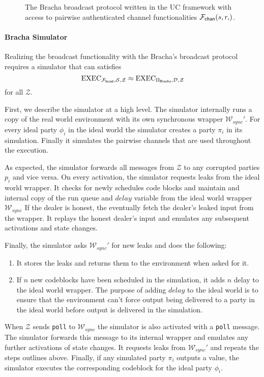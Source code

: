 \begin{figure}[!htb]
	
	\caption{The Bracha broadcast protocol written in the UC framework with access to pairwise authenticated channel functionalities $\Fchan{s,r}$.}
	\label{fig:prot:bracha_ours}
\end{figure}

\paragraph{Bracha Simulator}
Realizing the broadcast functionality with the Bracha's broadcast protocol requires a simulator that can satisfies
\[ \text{EXEC}_{\mathcal{F_{{\mathsf {bcast}}}},\mathcal{S},\mathcal{Z}} \approx \text{EXEC}_{\Pi_{{\mathsf {Bracha}}},\mathcal{D},\mathcal{Z}} \]
for all $\mathcal{Z}$.

First, we describe the simulator at a high level.
The simulator internally runs a copy of the real world environment with its own synchronous wrapper $\mathcal{W}_{sync}'$.
For every ideal party $\phi_i$ in the ideal world the simulator creates a party $\pi_i$ in its simulation.
Finally it simulates the pairwise channels that are used throughout the execution.

As expected, the simulator forwards all messages from $\mathcal{Z}$ to any corrupted parties $p_i$ and vice versa.
On every activation, the simulator requests leaks from the ideal world wrapper.
It checks for newly schedules code blocks and maintain and internal copy of the run queue and $delay$ variable from the ideal world wrapper $\mathcal{W}_{sync}$
If the dealer is honest, the eventually fetch the dealer's leaked input from the wrapper. 
It replays the honest dealer's input and emulates any subsequent activations and state changes.

Finally, the simulator asks $\mathcal{W}_{sync}'$ for new leaks and does the following:
\begin{enumerate}
	\item It stores the leaks and returns them to the environment when asked for it.
	\item If $n$ new codeblocks have been scheduled in the simulation, it adds $n$ delay to the ideal world wrapper. The purpose of adding $delay$ to the ideal world is to ensure that the environment can't force output being delivered to a party in the ideal world before output is delivered in the simulation.
\end{enumerate}

When $\mathcal{Z}$ sends \texttt{poll} to $\mathcal{W}_{sync}$ the simulator is also activated with a \texttt{poll} message.
The simulator forwards this message to its internal wrapper and emulates any further activations of state changes.
It requests leaks from $\mathcal{W}_{sync}'$ and repeats the steps outlines above.
Finally, if any simulated party $\pi_i$ outputs a value, the simulator executes the corresponding codeblock for the ideal party $\phi_i$.

